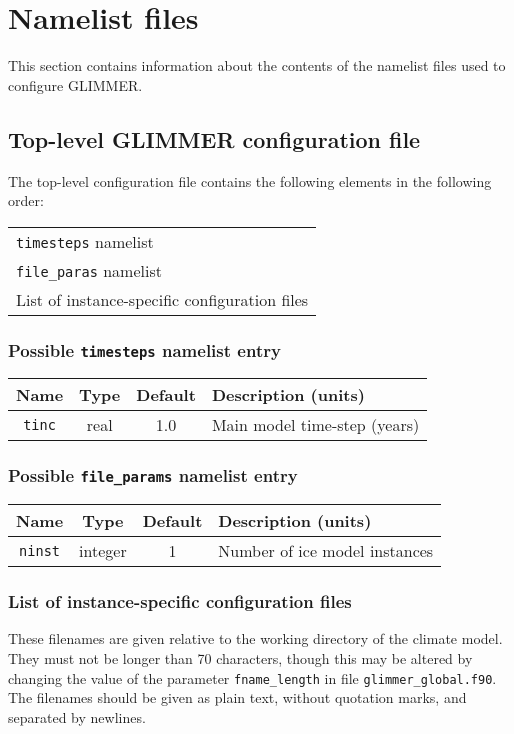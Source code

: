 \section{Namelist files}
%
This section contains information about the contents of the namelist files
used to configure GLIMMER.
%
\subsection{Top-level GLIMMER configuration file}
%
The top-level configuration file contains the following elements in the
following order:
\begin{center}
\begin{tabular}{l}
\texttt{timesteps} namelist \\
\texttt{file\_paras} namelist \\
List of instance-specific configuration files \\
\end{tabular}
\end{center}
%
\subsubsection {Possible \texttt{timesteps} namelist entry}
%
\begin{center}
\begin{tabular}{|c|c|c|l|}
\hline
Name & Type & Default & Description (units) \\
\hline
\hline
\texttt{tinc} & real & 1.0 & Main model time-step (years) \\
\hline
\end{tabular}
\end{center}
%
\subsubsection{Possible \texttt{file\_params} namelist entry}
\begin{center}
\begin{tabular}{|c|c|c|l|}
\hline
Name & Type & Default & Description (units) \\
\hline
\hline
\texttt{ninst} & integer & 1 & Number of ice model instances \\
\hline 
\end{tabular}
\end{center}
%
\subsubsection{List of instance-specific configuration files}
%
These filenames are given relative to the working directory of the climate
model. They must not be longer than 70 characters, though this may be altered
by changing the value of the parameter \texttt{fname\_length} in file
\texttt{glimmer\_global.f90}. The filenames should be given as plain text,
without quotation marks, and separated by newlines. 
%
